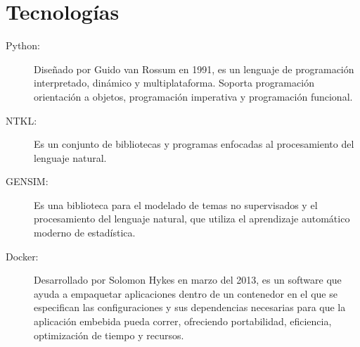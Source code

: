     \section{Tecnologías}
        \begin{description}
            \item[Python:] Diseñado por Guido van Rossum en 1991, es un lenguaje de programación interpretado, dinámico y multiplataforma.
            Soporta programación orientación a objetos, programación imperativa y programación funcional.
            \item[NTKL:] Es un conjunto de bibliotecas y programas enfocadas al procesamiento del lenguaje natural.
            \item[GENSIM:] Es una biblioteca para el modelado de temas no supervisados y el procesamiento del lenguaje natural, que utiliza el aprendizaje automático moderno de estadística.
            \item[Docker:] Desarrollado por Solomon Hykes en marzo del 2013, es un software que ayuda a empaquetar aplicaciones dentro de un contenedor en el que se especifican las configuraciones y sus dependencias necesarias para que la aplicación embebida pueda correr, ofreciendo portabilidad, eficiencia, optimización de tiempo y recursos.
            

\end{description}
